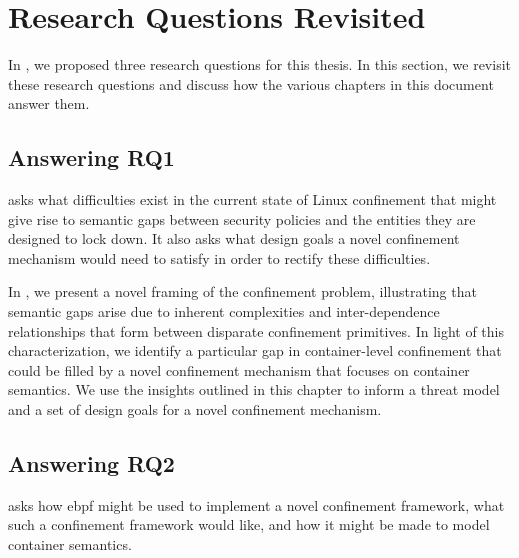 \section{Research Questions Revisited}%
\label{s:disc-rqs}

In , we proposed three research questions for this thesis. In this
section, we revisit these research questions and discuss how the various chapters in this
document answer them.

\subsection{Answering RQ1}%
\label{ss:disc-rq1}

 asks what difficulties exist in the current state of Linux confinement that
might give rise to semantic gaps between security policies and the entities they are
designed to lock down. It also asks what design goals a novel confinement mechanism would
need to satisfy in order to rectify these difficulties.

In , we present a novel framing of the confinement problem,
illustrating that semantic gaps arise due to inherent complexities and inter-dependence
relationships that form between disparate confinement primitives.  In light of this
characterization, we identify a particular gap in container-level confinement that could
be filled by a novel confinement mechanism that focuses on container semantics. We use the
insights outlined in this chapter to inform a threat model and a set of design goals for
a novel confinement mechanism.

\subsection{Answering RQ2}%
\label{ss:disc-rq2}

 asks how \gls{ebpf} might be used to implement a novel confinement framework,
what such a confinement framework would like, and how it might be made to model container
semantics.

